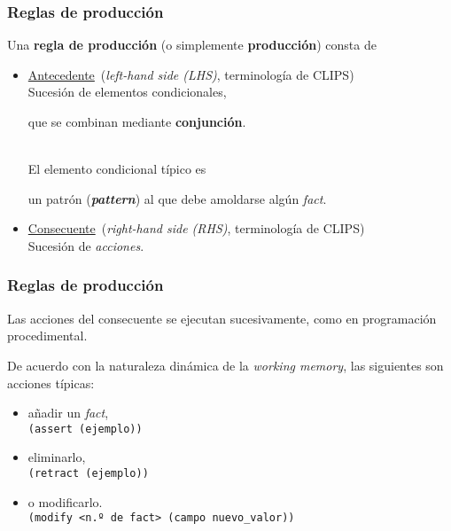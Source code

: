 \documentclass{beamer}    %
\begin{document}
\begin{frame}
 \frametitle{Reglas de producción}

 Una {\bf regla de producción} (o simplemente {\bf
   producción}) consta de
 \begin{itemize}
 \item \underline{Antecedente}\hfill
  (\emph{left-hand side (LHS)}, terminología de CLIPS)\\[2mm]

 Sucesión de elementos condicionales,\\[1mm]
 \hfill\parbox{.85\linewidth}{que se combinan mediante {\bf
     conjunción}.}\\[2mm]

 El elemento condicional típico es\\[1mm]
 \hfill\parbox{.85\linewidth}{un patrón ({\bf \emph{pattern}})
   al que debe amoldarse algún \emph{fact}.}
 \vspace{5mm}

 \item \underline{Consecuente}\hfill
  (\emph{right-hand side (RHS)}, terminología de CLIPS)\\[2mm]

 Sucesión de \emph{acciones}.
 \end{itemize}
\end{frame}

\begin{frame}
 \frametitle{Reglas de producción}

 Las acciones del consecuente se ejecutan sucesivamente,
 como en programación procedimental.
 \vspace{5mm}

 De acuerdo con la naturaleza dinámica de la \emph{working
   memory}, las siguientes son acciones típicas:

 \begin{itemize}
 \item añadir un \emph{fact},\\
 \hspace{1.5cm}\texttt{(assert (ejemplo))}
 \item eliminarlo,\\
 \hspace{1.5cm}\texttt{(retract (ejemplo))}
 \item o modificarlo.\\
 \hspace{1.5cm}\texttt{(modify <n.º de fact> (campo nuevo\_valor))}
 \end{itemize}
\end{frame}
\end{document}

